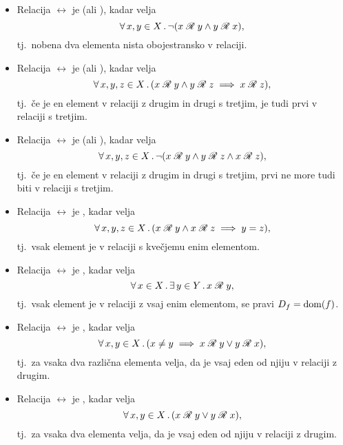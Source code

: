 \begin{definicija}
\begin{itemize}
                                \item
                                        Relacija $\rel$ je  (ali ), kadar velja
                                        \[\xall{x, y}[X]{\lnot(\rel[x][y] \land \rel[y][x])},\]
                                        tj.~nobena dva elementa nista obojestransko v relaciji.
                                \item
                                        Relacija $\rel$ je  (ali ), kadar velja
                                        \[\all{x, y, z}[X]{\rel[x][y] \land \rel[y][z] \implies \rel[x][z]},\]
                                        tj.~če je en element v relaciji z drugim in drugi s tretjim, je tudi prvi v relaciji s tretjim.
                                \item
                                        Relacija $\rel$ je  (ali ), kadar velja
                                        \[\xall{x, y, z}[X]{\lnot(\rel[x][y] \land \rel[y][z] \land \rel[x][z])},\]
                                        tj.~če je en element v relaciji z drugim in drugi s tretjim, prvi ne more tudi biti v relaciji s tretjim.
                                \item
                                        Relacija $\rel$ je , kadar velja
                                        \[\all{x, y, z}[X]{\rel[x][y] \land \rel[x][z] \implies y = z},\]
                                        tj.~vsak element je v relaciji s kvečjemu enim elementom.
                                \item
                                        Relacija $\rel$ je , kadar velja
                                        \[\xall{x}[X]{\xsome{y}[Y]{\rel[x][y]}},\]
                                        tj.~vsak element je v relaciji z vsaj enim elementom, se pravi $D_{f} = \mathrm{dom}(f)$.
                                \item
                                        Relacija $\rel$ je , kadar velja
                                        \[\all{x, y}[X]{x \neq y \implies \rel[x][y] \lor \rel[y][x]},\]
                                        tj.~za vsaka dva različna elementa velja, da je vsaj eden od njiju v relaciji z drugim.
                                \item
                                        Relacija $\rel$ je , kadar velja
                                        \[\all{x, y}[X]{\rel[x][y] \lor \rel[y][x]},\]
                                        tj.~za vsaka dva elementa velja, da je vsaj eden od njiju v relaciji z drugim.
                        \end{itemize}
                \end{definicija}

